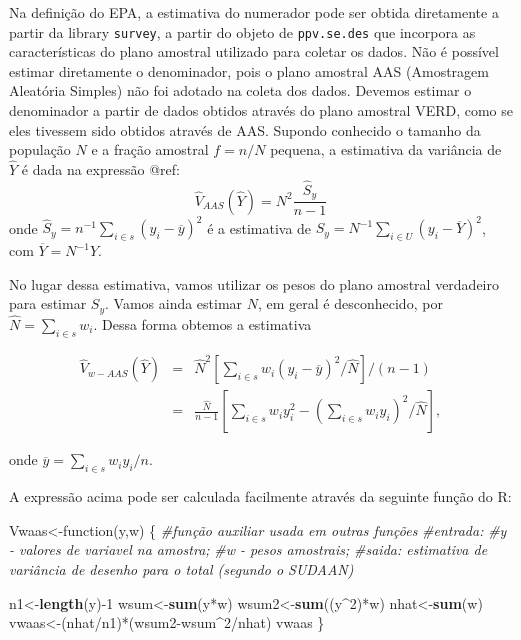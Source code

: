 \documentclass[]{book}
\newenvironment{Shaded}{\begin{snugshade}}{\end{snugshade}}
\newcommand{\KeywordTok}[1]{\textcolor[rgb]{0.13,0.29,0.53}{\textbf{{#1}}}}
\newcommand{\DecValTok}[1]{\textcolor[rgb]{0.00,0.00,0.81}{{#1}}}
\newcommand{\CommentTok}[1]{\textcolor[rgb]{0.56,0.35,0.01}{\textit{{#1}}}}
\newcommand{\NormalTok}[1]{{#1}}
\numberwithin{example}{chapter}
\numberwithin{remark}{chapter}
\numberwithin{definition}{chapter}
\begin{document}
Na definição do EPA, a estimativa do numerador pode ser obtida
diretamente a partir da library \texttt{survey}, a partir do objeto de
\texttt{ppv.se.des} que incorpora as características do plano amostral
utilizado para coletar os dados. Não é possível estimar diretamente o
denominador, pois o plano amostral AAS (Amostragem Aleatória Simples)
não foi adotado na coleta dos dados. Devemos estimar o denominador a
partir de dados obtidos através do plano amostral VERD, como se eles
tivessem sido obtidos através de AAS. Supondo conhecido o tamanho da
população \(N\) e a fração amostral \(f=n/N\) pequena, a estimativa da
variância de \(\widehat{Y}\) é dada na expressão @ref:\label{eq:estpa9} \[
\widehat{V}_{AAS}\left(\widehat{Y}\right)=N^2\frac{\widehat{S}_y}{n-1}
\] onde
\(\widehat{S}_y= n^{-1}\sum_{i\in s}\left(y_i-\overline{y}\right)^2\) é
a estimativa de
\(S_y=N^{-1}\sum_{i\in U}\left(y_i-\overline{Y}\right)^2\), com
\(\overline{Y}=N^{-1}Y\).

No lugar dessa estimativa, vamos utilizar os pesos do plano amostral
verdadeiro para estimar \(S_y\). Vamos ainda estimar \(N\), em geral é
desconhecido, por \(\widehat{N}=\sum_{i \in s} w_i\). Dessa forma
obtemos a estimativa

\begin{eqnarray*}
\widehat{V}_{w-AAS}\left(\widehat{Y}\right)&=& \widehat{N}^2\left[\sum_{i \in s}w_i\left(y_i-\overline{y}\right)^2/\widehat{N}\right]/(n-1)\\
&=&\frac{\widehat{N}}{n-1}\left[\sum_{i \in s}w_iy_i^2-\left(\sum_{i \in s}w_iy_i\right)^2/\widehat{N}\right],
\end{eqnarray*}

onde \(\overline{y}=\sum_{i \in s}w_iy_i/n\).

A expressão acima pode ser calculada facilmente através da seguinte
função do R:

\begin{Shaded}
\begin{Highlighting}[]
\NormalTok{Vwaas<-function(y,w)}
\NormalTok{\{}
\CommentTok{#função auxiliar usada em outras funções}
\CommentTok{#entrada:}
\CommentTok{#y - valores de variavel na amostra;}
\CommentTok{#w - pesos amostrais;}
\CommentTok{#saida:  estimativa de variância de desenho para o total (segundo o SUDAAN)}

\NormalTok{n1<-}\KeywordTok{length}\NormalTok{(y)-}\DecValTok{1}
\NormalTok{wsum<-}\KeywordTok{sum}\NormalTok{(y*w)}
\NormalTok{wsum2<-}\KeywordTok{sum}\NormalTok{((y^}\DecValTok{2}\NormalTok{)*w)}
\NormalTok{nhat<-}\KeywordTok{sum}\NormalTok{(w)}
\NormalTok{vwaas<-(nhat/n1)*(wsum2-wsum^}\DecValTok{2}\NormalTok{/nhat)}
\NormalTok{vwaas}
\NormalTok{\}}
\end{Highlighting}
\end{Shaded}
\end{document}
